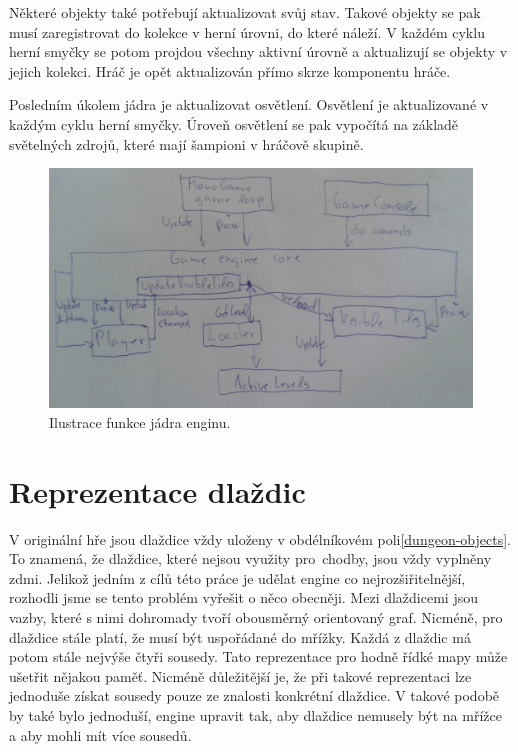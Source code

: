 Některé objekty také potřebují aktualizovat svůj stav. Takové objekty se pak musí zaregistrovat do kolekce v herní úrovni,
do které náleží. V každém cyklu herní smyčky se potom projdou všechny aktivní úrovně a aktualizují se objekty v jejich kolekci.
Hráč je opět aktualizován přímo skrze komponentu hráče.

Posledním úkolem jádra je aktualizovat osvětlení. Osvětlení je aktualizované v každým cyklu herní smyčky. Úroveň osvětlení 
se pak vypočítá na základě světelných zdrojů, které mají šampioni v hráčově skupině.

\begin{figure}[H]\centering
\includegraphics[width=\textwidth]{./img/engine-core.png}
\caption{Ilustrace funkce jádra enginu.}
\label{engine-core}
\end{figure}


\section{Reprezentace dlaždic}\label{tile-representation}

V originální hře jsou dlaždice vždy uloženy v obdélníkovém poli\vref{dungeon-objects}. To znamená, že dlaždice, které nejsou využity pro~chodby,
jsou vždy vyplněny zdmi. Jelikož jedním z cílů této práce je udělat engine co nejrozšiřitelnější, rozhodli jsme se tento problém vyřešit
o něco obecněji. Mezi dlaždicemi jsou vazby, které s nimi dohromady tvoří obousměrný orientovaný graf. Nicméně, pro dlaždice stále platí, že musí být
uspořádané do mřížky. Každá z dlaždic má potom stále nejvýše čtyři sousedy. Tato reprezentace pro hodně řídké mapy může ušetřit nějakou paměť.
Nicméně důležitější je, že při takové reprezentaci lze jednoduše získat sousedy pouze ze znalosti konkrétní dlaždice. V takové 
podobě by také bylo jednoduší, engine upravit tak, aby dlaždice nemusely být na mřížce a aby mohli mít více sousedů.

